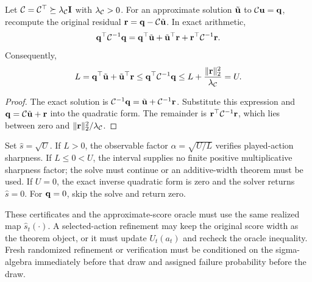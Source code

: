 \begin{lemma}
\label{lem:inverse-quadratic-certificate-new}
Let $\mathcal{C}=\mathcal{C}^\top\succeq\lambda_{\mathcal{C}}\mathbf{I}$ with
$\lambda_{\mathcal{C}}>0$.  For an approximate solution $\tilde{\mathbf{u}}$ to
$\mathcal{C}\mathbf{u}=\mathbf{q}$, recompute the original residual
$\mathbf{r}=\mathbf{q}-\mathcal{C}\tilde{\mathbf{u}}$.  In exact arithmetic,
\begin{equation}\label{eq:inverse-quadratic-identity-new}
 \mathbf{q}^\top\mathcal{C}^{-1}\mathbf{q}
 =\mathbf{q}^\top\tilde{\mathbf{u}}+\tilde{\mathbf{u}}^\top\mathbf{r}
 +\mathbf{r}^\top\mathcal{C}^{-1}\mathbf{r}.
\end{equation}
Consequently,
\begin{equation}\label{eq:inverse-quadratic-interval-new}
 L=\mathbf{q}^\top\tilde{\mathbf{u}}+\tilde{\mathbf{u}}^\top\mathbf{r}
 \le\mathbf{q}^\top\mathcal{C}^{-1}\mathbf{q}
 \le L+\frac{\|\mathbf{r}\|_2^2}{\lambda_{\mathcal{C}}}=U.
\end{equation}
\end{lemma}
\begin{proof}
The exact solution is
$\mathcal{C}^{-1}\mathbf{q}=\tilde{\mathbf{u}}+\mathcal{C}^{-1}\mathbf{r}$.  Substitute this expression and
$\mathbf{q}=\mathcal{C}\tilde{\mathbf{u}}+\mathbf{r}$ into the quadratic form.  The remainder is
$\mathbf{r}^\top\mathcal{C}^{-1}\mathbf{r}$, which lies between zero and
$\|\mathbf{r}\|_2^2/\lambda_{\mathcal{C}}$.
\end{proof}

Set $\hat s=\sqrt{U}$.  If $L>0$, the observable factor
$\alpha=\sqrt{U/L}$ verifies played-action sharpness.  If $L\le0<U$, the
interval supplies no finite positive multiplicative sharpness factor; the solve
must continue or an additive-width theorem must be used.  If $U=0$, the exact
inverse quadratic form is zero and the solver returns $\hat s=0$.  For
$\mathbf{q}=0$, skip the solve and return zero.

These certificates and the approximate-score oracle must use the same realized
map $\hat s_t(\cdot)$.  A selected-action refinement may keep the original score
width as the theorem object, or it must update $U_t(a_t)$ and recheck the oracle
inequality.  Fresh randomized refinement or verification must be conditioned on
the sigma-algebra immediately before that draw and assigned failure probability
before the draw.

